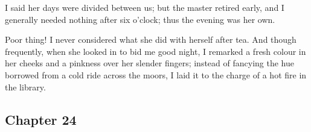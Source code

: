 \par I said her days were divided between us; but the master retired early, and I generally needed nothing after six o'clock; thus the evening was her own.
\par Poor thing! I never considered what she did with herself after tea. And though frequently, when she looked in to bid me good night, I remarked a fresh colour in her cheeks and a pinkness over her slender fingers; instead of fancying the hue borrowed from a cold ride across the moors, I laid it to the charge of a hot fire in the library.















\subsection*{Chapter 24}

